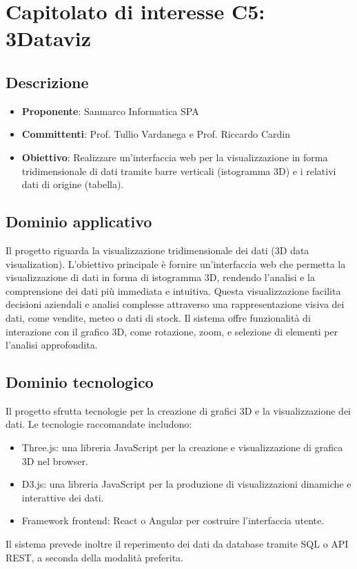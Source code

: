 \documentclass[italian, 12pt]{article}
\begin{document}
\section{Capitolato di interesse C5: 3Dataviz}
\subsection{Descrizione}
\begin{itemize}
\item\textbf{Proponente}: Sanmarco Informatica SPA
\item\textbf{Committenti}: Prof. Tullio Vardanega e Prof. Riccardo Cardin
\item\textbf{Obiettivo}: Realizzare un'interfaccia web per la visualizzazione in forma tridimensionale di dati tramite barre verticali (istogramma 3D) e i relativi dati di origine (tabella).
\end{itemize}

\subsection{Dominio applicativo}
Il progetto riguarda la visualizzazione tridimensionale dei dati (3D data visualization). L'obiettivo principale è fornire un'interfaccia web che permetta la visualizzazione di dati in forma di istogramma 3D, rendendo l'analisi e la comprensione dei dati più immediata e intuitiva. Questa visualizzazione facilita decisioni aziendali e analisi complesse attraverso una rappresentazione visiva dei dati, come vendite, meteo o dati di stock. Il sistema offre funzionalità di interazione con il grafico 3D, come rotazione, zoom, e selezione di elementi per l'analisi approfondita.

\subsection{Dominio tecnologico}
Il progetto sfrutta tecnologie per la creazione di grafici 3D e la visualizzazione dei dati. Le tecnologie raccomandate includono:
\begin{itemize}
\item Three.js: una libreria JavaScript per la creazione e visualizzazione di grafica 3D nel browser.
\item D3.js: una libreria JavaScript per la produzione di visualizzazioni dinamiche e interattive dei dati.
\item Framework frontend: React o Angular per costruire l'interfaccia utente.
\end{itemize}
Il sistema prevede inoltre il reperimento dei dati da database tramite SQL o API REST, a seconda della modalità preferita.
\end{document}
